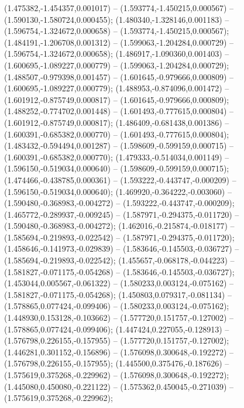  (1.475382,-1.454357,0.001017) -- (1.593774,-1.450215,0.000567) -- (1.590130,-1.580724,0.000455);
 (1.480340,-1.328146,0.001183) -- (1.596754,-1.324672,0.000658) -- (1.593774,-1.450215,0.000567);
 (1.484191,-1.206708,0.001312) -- (1.599063,-1.204284,0.000729) -- (1.596754,-1.324672,0.000658);
 (1.486917,-1.090360,0.001403) -- (1.600695,-1.089227,0.000779) -- (1.599063,-1.204284,0.000729);
 (1.488507,-0.979398,0.001457) -- (1.601645,-0.979666,0.000809) -- (1.600695,-1.089227,0.000779);
 (1.488953,-0.874096,0.001472) -- (1.601912,-0.875749,0.000817) -- (1.601645,-0.979666,0.000809);
 (1.488252,-0.774702,0.001448) -- (1.601493,-0.777615,0.000804) -- (1.601912,-0.875749,0.000817);
 (1.486409,-0.681438,0.001386) -- (1.600391,-0.685382,0.000770) -- (1.601493,-0.777615,0.000804);
 (1.483432,-0.594494,0.001287) -- (1.598609,-0.599159,0.000715) -- (1.600391,-0.685382,0.000770);
 (1.479333,-0.514034,0.001149) -- (1.596150,-0.519034,0.000640) -- (1.598609,-0.599159,0.000715);
 (1.474466,-0.438785,0.000361) -- (1.593222,-0.443747,-0.000209) -- (1.596150,-0.519034,0.000640);
 (1.469920,-0.364222,-0.003060) -- (1.590480,-0.368983,-0.004272) -- (1.593222,-0.443747,-0.000209);
 (1.465772,-0.289937,-0.009245) -- (1.587971,-0.294375,-0.011720) -- (1.590480,-0.368983,-0.004272);
 (1.462016,-0.215874,-0.018177) -- (1.585694,-0.219893,-0.022542) -- (1.587971,-0.294375,-0.011720);
 (1.458646,-0.141973,-0.029839) -- (1.583646,-0.145503,-0.036727) -- (1.585694,-0.219893,-0.022542);
 (1.455657,-0.068178,-0.044223) -- (1.581827,-0.071175,-0.054268) -- (1.583646,-0.145503,-0.036727);
 (1.453044,0.005567,-0.061322) -- (1.580233,0.003124,-0.075162) -- (1.581827,-0.071175,-0.054268);
 (1.450803,0.079317,-0.081134) -- (1.578865,0.077424,-0.099406) -- (1.580233,0.003124,-0.075162);
 (1.448930,0.153128,-0.103662) -- (1.577720,0.151757,-0.127002) -- (1.578865,0.077424,-0.099406);
 (1.447424,0.227055,-0.128913) -- (1.576798,0.226155,-0.157955) -- (1.577720,0.151757,-0.127002);
 (1.446281,0.301152,-0.156896) -- (1.576098,0.300648,-0.192272) -- (1.576798,0.226155,-0.157955);
 (1.445500,0.375476,-0.187626) -- (1.575619,0.375268,-0.229962) -- (1.576098,0.300648,-0.192272);
 (1.445080,0.450080,-0.221122) -- (1.575362,0.450045,-0.271039) -- (1.575619,0.375268,-0.229962);
